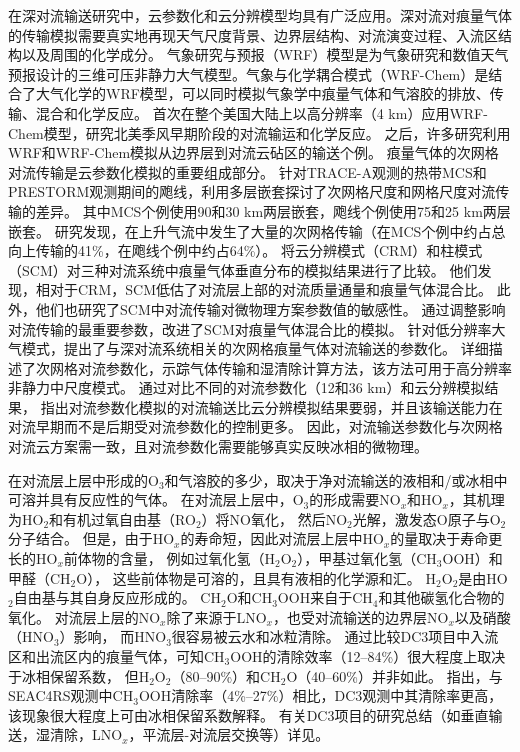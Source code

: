 在深对流输送研究中，云参数化和云分辨模型均具有广泛应用。深对流对痕量气体的传输模拟需要真实地再现天气尺度背景、边界层结构、对流演变过程、入流区结构以及周围的化学成分。 气象研究与预报（WRF）模型是为气象研究和数值天气预报设计的三维可压非静力大气模型。气象与化学耦合模式（WRF-Chem）是结合了大气化学的WRF模型，可以同时模拟气象学中痕量气体和气溶胶的排放、传输、混合和化学反应\citep{Fast.2006,Grell.2005}。
\citet{Barth.2012}首次在整个美国大陆上以高分辨率（4 km）应用WRF-Chem模型，研究北美季风早期阶段的对流输运和化学反应。
之后，许多研究利用WRF和WRF-Chem模拟从边界层到对流云砧区的输送个例\citep{Bela.2016,Li.2017b,Li.2018}。
痕量气体的次网格对流传输是云参数化模拟的重要组成部分。
\citet{Wang.1996}针对TRACE-A观测的热带MCS和PRESTORM观测期间的飑线，利用多层嵌套探讨了次网格尺度和网格尺度对流传输的差异。
其中MCS个例使用90和30 km两层嵌套，飑线个例使用75和25 km两层嵌套。
研究发现，在上升气流中发生了大量的次网格传输（在MCS个例中约占总向上传输的41\%，在飑线个例中约占64\%）。
\citet{Ott.2009}将云分辨模式（CRM）和柱模式（SCM）对三种对流系统中痕量气体垂直分布的模拟结果进行了比较。
他们发现，相对于CRM，SCM低估了对流层上部的对流质量通量和痕量气体混合比。
此外，他们也研究了SCM中对流传输对微物理方案参数值的敏感性。
通过调整影响对流传输的最重要参数，改进了SCM对痕量气体混合比的模拟。
\citet{Freitas.2000}针对低分辨率大气模式，提出了与深对流系统相关的次网格痕量气体对流输送的参数化。
\citet{Grell.2014}详细描述了次网格对流参数化，示踪气体传输和湿清除计算方法，该方法可用于高分辨率非静力中尺度模式。
\citet{Li.2018}通过对比不同的对流参数化（12和36 km）和云分辨模拟结果，
指出对流参数化模拟的对流输送比云分辨模拟结果要弱，并且该输送能力在对流早期而不是后期受对流参数化的控制更多。
因此，对流输送参数化与次网格对流云方案需一致，且对流参数化需要能够真实反映冰相的微物理。

在对流层上层中形成的O$_3$和气溶胶的多少，取决于净对流输送的液相和/或冰相中可溶并具有反应性的气体。
在对流层上层中，O$_3$的形成需要NO$_x$和HO$_x$，其机理为HO$_2$和有机过氧自由基（RO$_2$）将NO氧化，
然后NO$_2$光解，激发态O原子与O$_2$分子结合。
但是，由于HO$_x$的寿命短，因此对流层上层中HO$_x$的量取决于寿命更长的HO$_x$前体物的含量\citep{Chatfield.1984,Prather.1997}，
例如过氧化氢（H$_2$O$_2$），甲基过氧化氢（CH$_3$OOH）和甲醛（CH$_2$O），
这些前体物是可溶的，且具有液相的化学源和汇\citep{Barth.2007,Carlton.2007}。
H$_2$O$_2$是由HO$_2$自由基与其自身反应形成的。 CH$_2$O和CH$_3$OOH来自于CH$_4$和其他碳氢化合物的氧化。
对流层上层的NO$_x$除了来源于LNO$_x$，也受对流输送的边界层NO$_x$以及硝酸（HNO$_3$）影响\citep{Grassian.2005}，
而HNO$_3$很容易被云水和冰粒清除\citep{Neu.2012}。
通过比较DC3项目中入流区和出流区内的痕量气体，可知CH$_3$OOH的清除效率（12--84\%）很大程度上取决于冰相保留系数，
但H$_2$O$_2$（80--90\%）和CH$_2$O（40--60\%）并非如此\citep{Barth.2016,Bela.2016,Fried.2016}。
\citet{Cuchiara.2020}指出，与SEAC4RS观测中CH$_3$OOH清除率（4\%--27\%）相比，DC3观测中其清除率更高，该现象很大程度上可由冰相保留系数解释。
有关DC3项目的研究总结（如垂直输送，湿清除，LNO$_x$，平流层-对流层交换等）详见\citet{Barth.2019}。


